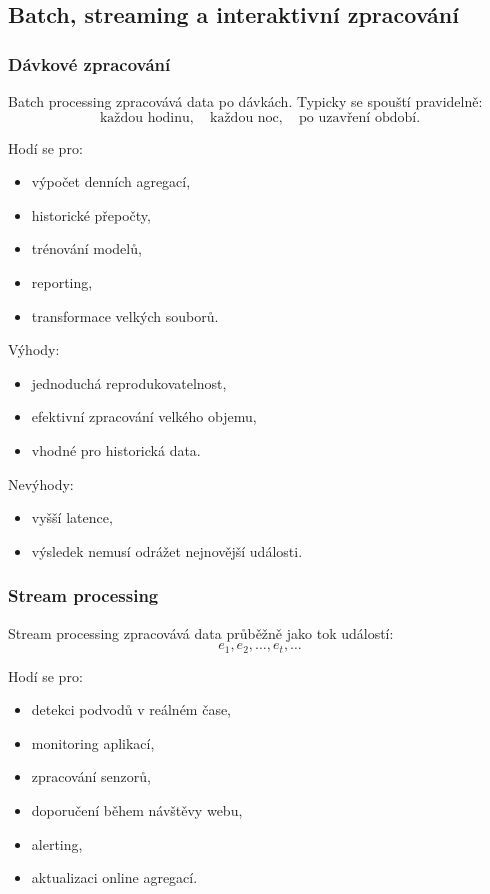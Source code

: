 \subsection{Batch, streaming a interaktivní zpracování}

\subsubsection{Dávkové zpracování}

Batch processing zpracovává data po dávkách. Typicky se spouští pravidelně:
\[
\text{každou hodinu},\quad
\text{každou noc},\quad
\text{po uzavření období}.
\]

Hodí se pro:
\begin{itemize}
    \item výpočet denních agregací,
    \item historické přepočty,
    \item trénování modelů,
    \item reporting,
    \item transformace velkých souborů.
\end{itemize}

Výhody:
\begin{itemize}
    \item jednoduchá reprodukovatelnost,
    \item efektivní zpracování velkého objemu,
    \item vhodné pro historická data.
\end{itemize}

Nevýhody:
\begin{itemize}
    \item vyšší latence,
    \item výsledek nemusí odrážet nejnovější události.
\end{itemize}

\subsubsection{Stream processing}

Stream processing zpracovává data průběžně jako tok událostí:
\[
e_1,e_2,\ldots,e_t,\ldots
\]

Hodí se pro:
\begin{itemize}
    \item detekci podvodů v reálném čase,
    \item monitoring aplikací,
    \item zpracování senzorů,
    \item doporučení během návštěvy webu,
    \item alerting,
    \item aktualizaci online agregací.
\end{itemize}

